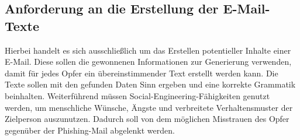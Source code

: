 	\subsection{Anforderung an die Erstellung der E-Mail-Texte}
	Hierbei handelt es sich ausschließlich um das Erstellen potentieller Inhalte einer E-Mail. Diese sollen die gewonnenen Informationen zur Generierung verwenden, damit für jedes Opfer ein übereinstimmender Text erstellt werden kann. Die Texte sollen mit den gefunden Daten Sinn ergeben und eine korrekte Grammatik beinhalten. Weiterführend müssen Social-Engineering-Fähigkeiten genutzt werden, um menschliche Wünsche, Ängste und verbreitete Verhaltensmuster der Zielperson auszunutzen. \cite{LeitfadenSE} Dadurch soll von dem möglichen Misstrauen des Opfer gegenüber der Phishing-Mail abgelenkt werden. 

